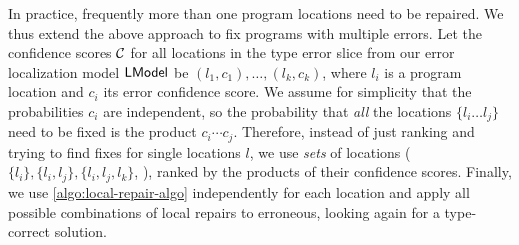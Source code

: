 In practice, frequently more than one program locations need to be repaired. We
thus extend the above approach to fix programs with multiple errors. Let the
confidence scores $\mathcal{C}$ for all locations in the type error slice from our
error localization model $\mathsf{LModel}$ be $(l_1, c_1), \dots, (l_k, c_k)$, where
$l_i$ is a program location and $c_i$ its error confidence score. We assume for
simplicity that the probabilities $c_i$ are independent, so the probability that
\emph{all} the locations $\{l_i \dots l_j\}$ need to be fixed is the product
$c_i \cdots c_j$. Therefore, instead of just ranking and trying to find fixes
for single locations $l$, we use \emph{sets} of locations ($\{l_i\}, \{l_i,
l_j\}, \{l_i, l_j, l_k\}$, \etc), ranked by the products of their confidence
scores. Finally, we use \autoref{algo:local-repair-algo} independently for each
location and apply all possible combinations of local repairs to erroneous,
looking again for a type-correct solution.

\lstDeleteShortInline{|}
